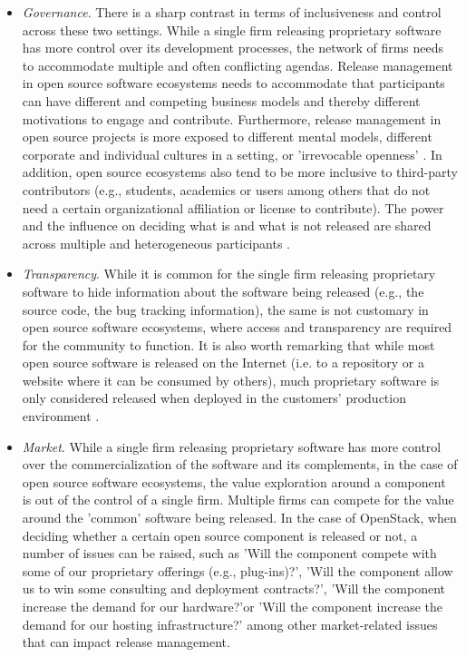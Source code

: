 \documentclass[dvipsnames]{interact}
\theoremstyle{plain}\newtheorem{theorem}{Theorem}[section]
\theoremstyle{definition}
\theoremstyle{remark}
\begin{document}
\begin{itemize}
 \item \textit{Governance}.  There is a sharp contrast in terms of inclusiveness and control across these two settings. While a single firm releasing proprietary software has more control over its development processes, the network of firms needs to accommodate multiple and often conflicting agendas. Release management in open source software ecosystems needs to accommodate that participants can have different and competing business models and thereby different motivations to engage and contribute. Furthermore, release management in open source projects is more exposed to different mental models, different corporate and individual cultures in a setting, or 'irrevocable openness' \citep{Howison_and_Crowston2014}. 
 In addition, open source ecosystems also tend to be more inclusive to third-party contributors (e.g., students, academics or users among others that do not need a certain organizational affiliation or license to contribute). The power and the influence on deciding what is and what is not released are shared across multiple and heterogeneous participants \citep{Teixeira_et_al2015}. 
 
 \item \textit{Transparency}.  While it is common for the single firm releasing proprietary software to hide information about the software being released (e.g., the source code, the bug tracking information), the same is not customary in open source software ecosystems, where access and transparency are required for the community to function. It is also worth remarking that while most open source software is released on the Internet (i.e. to a repository or a website where it can be consumed by others), much proprietary software is only considered released when deployed in the customers' production environment \citep{LaukkanenPaasivaara_et_al2018}.
 
 \item \textit{Market}. While a single firm releasing proprietary software has more control over the commercialization of the software and its complements, in the case of open source software ecosystems, the value exploration around a component is out of the control of a single firm. Multiple firms can compete for the value around the 'common' software being released. In the case of OpenStack, when deciding whether a certain open source component is released or not, a number of issues can be raised, such as 'Will the component compete with some of our proprietary offerings (e.g., plug-ins)?', 'Will the component allow us to win some consulting and deployment contracts?', 'Will the component increase the demand for our hardware?'or 'Will the component increase the demand for our hosting infrastructure?'  among other market-related issues that can impact release management.


\end{itemize}
\end{document}

